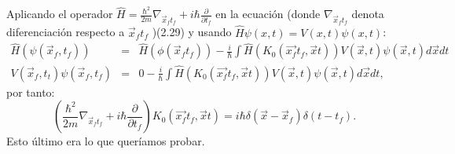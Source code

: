 Aplicando el operador $\hat{H}=\frac{\hbar^2}{2m}\nabla_{\vec{x}_ft_f}+i\hbar\frac{\partial}{\partial t_f}$ en la ecuación (donde $\nabla_{\vec{x}_ft_f}$ denota diferenciación respecto a $\vec{x}_ft_f$ )(2.29) y usando $\hat{H}\psi(x,t)=V(x,t)\psi(x,t)$:
\begin{eqnarray}
\nonumber \hat{H}(\psi(\vec{x}_f,t_f))&=&\hat{H}(\phi(\vec{x}_ft_f))-\frac{i}{\hbar}\int\hat{H} (K_{0}(\vec{x_{f}}t_{f},\vec{x}t))V(\vec{x},t)\psi(\vec{x},t)d\vec{x}dt\\
\nonumber V(\vec{x}_f,t_t)\psi(\vec{x}_f,t_f)&=&0-\frac{i}{\hbar}\int\hat{H} (K_{0}(\vec{x_{f}}t_{f},\vec{x}t))V(\vec{x},t)\psi(\vec{x},t)d\vec{x}dt ,
\end{eqnarray}
por tanto:
\begin{equation}
\left(\frac{\hbar^2}{2m}\nabla_{\vec{x}_ft_f}+i\hbar\frac{\partial}{\partial t_f}\right)K_{0}(\vec{x_{f}}t_{f},\vec{x}t)=i\hbar\delta(\vec{x}-\vec{x}_f)\delta(t-t_f).
\end{equation}
Esto último era lo que queríamos probar.








